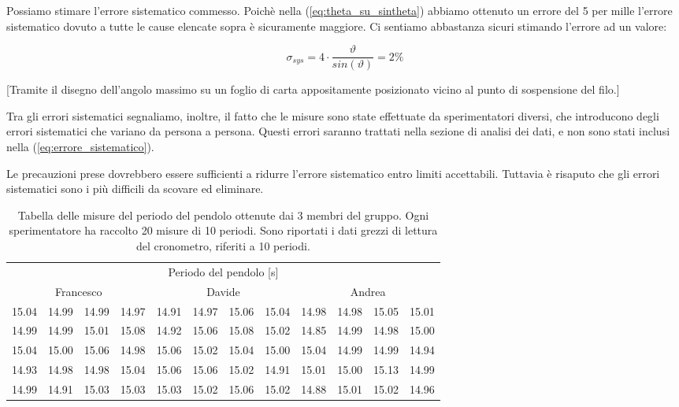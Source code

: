 Possiamo stimare l'errore sistematico commesso. Poichè nella (\ref{eq:theta_su_sintheta})
abbiamo ottenuto un errore del 5 per mille l'errore sistematico dovuto a tutte le
cause elencate sopra è sicuramente maggiore. Ci sentiamo abbastanza sicuri stimando
l'errore ad un valore:

\begin{equation}
    \sigma_{sys} = 4 \cdot \frac{\vartheta}{sin(\vartheta)} = 2 \%
    \label{eq:errore_sistematico}
\end{equation}

[Tramite il disegno dell'angolo massimo su un foglio di carta appositamente
posizionato vicino al punto di sospensione del filo.]

Tra gli errori sistematici segnaliamo, inoltre, il fatto che le misure sono state
effettuate da sperimentatori diversi, che introducono degli errori sistematici
che variano da persona a persona. Questi errori saranno trattati nella sezione
di analisi dei dati, e non sono stati inclusi nella (\ref{eq:errore_sistematico}).

Le precauzioni prese dovrebbero essere sufficienti a ridurre l'errore sistematico
entro limiti accettabili. Tuttavia è risaputo che gli errori sistematici
sono i più difficili da scovare ed eliminare.
	
\begin{table}[bt]
	\begin{tabular} {c c c c | c c c c | c c c c}
		\toprule
		\multicolumn{12}{c}{Periodo del pendolo [s]} \\
		\multicolumn{4}{c}{Francesco} & \multicolumn{4}{c}{Davide} & \multicolumn{4}{c}{Andrea} \\
		\midrule
		15.04 & 14.99 & 14.99 & 14.97 & 14.91 & 14.97 & 15.06 & 15.04 & 14.98 & 14.98 & 15.05 & 15.01 \\
		14.99 & 14.99 & 15.01 & 15.08 & 14.92 & 15.06 & 15.08 & 15.02 & 14.85 & 14.99 & 14.98 & 15.00 \\
		15.04 & 15.00 & 15.06 & 14.98 & 15.06 & 15.02 & 15.04 & 15.00 & 15.04 & 14.99 & 14.99 & 14.94 \\
		14.93 & 14.98 & 14.98 & 15.04 & 15.06 & 15.06 & 15.02 & 14.91 & 15.01 & 15.00 & 15.13 & 14.99 \\
		14.99 & 14.91 & 15.03 & 15.03 & 15.03 & 15.02 & 15.06 & 15.02 & 14.88 & 15.01 & 15.02 & 14.96 \\
		\bottomrule
	\end{tabular}

	\caption{Tabella delle misure del periodo del pendolo ottenute dai 3 membri del gruppo.
        Ogni sperimentatore ha raccolto 20 misure di 10 periodi. Sono riportati
        i dati grezzi di lettura del cronometro, riferiti a 10 periodi. }
    \label{tab:pendolo}
\end{table}

